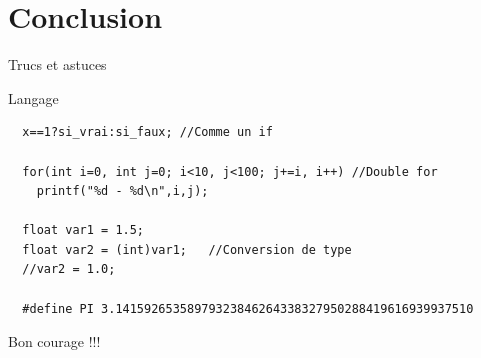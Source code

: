 \documentclass{beamer}
\begin{document}
\section{Conclusion}
\begin{frame}[fragile]{Trucs et astuces}
  \begin{scriptsize}
    \begin{block}{Langage}
\begin{verbatim}
  x==1?si_vrai:si_faux; //Comme un if
  
  for(int i=0, int j=0; i<10, j<100; j+=i, i++) //Double for
    printf("%d - %d\n",i,j);  
  
  float var1 = 1.5;
  float var2 = (int)var1;	//Conversion de type
  //var2 = 1.0;
  
  #define PI 3.14159265358979323846264338327950288419616939937510
\end{verbatim}
    \end{block}
  \end{scriptsize}
  
  \pause
  \vspace{1cm}
    \begin{center}
    {\huge Bon courage !!!}
    \end{center}
\end{frame}
\end{document}
